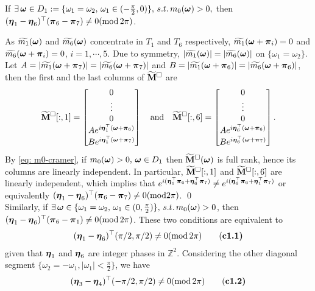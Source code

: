 \begin{lemma}\label{lem: phase-ineq}
If $\exists\,\boldsymbol{\omega}\in D_1:=\{\omega_1=\omega_2,\,\omega_1\in(-\frac{\pi}{2},0)\},\,s.t. \,m_0(\boldsymbol{\omega})>0,$ then $(\boldsymbol{\eta}_1-\boldsymbol{\eta}_6)^\top (\boldsymbol{\pi}_6-\boldsymbol{\pi}_7)\neq 0(\text{mod}\,2\pi)$. 
\end{lemma} 
As $\widetilde{m_{1}}(\boldsymbol{\omega})$ and $\widetilde{m_{6}}(\boldsymbol{\omega})$ concentrate in $T_1$ and $T_6$ respectively, $\widetilde{m_1}(\boldsymbol{\omega} + \boldsymbol{\pi}_i) = 0$ and  $\widetilde{m_6}(\boldsymbol{\omega} + \boldsymbol{\pi}_i) = 0$, $i = 1,\cdots, 5$. Due to symmetry, $|\widetilde{m_1}(\boldsymbol{\omega})| = |\widetilde{m_6}(\boldsymbol{\omega})|$ on $\{\omega_1=\omega_2\}$. Let $A = |\widetilde{m_1}(\boldsymbol{\omega}+\boldsymbol{\pi}_7)| = |\widetilde{m_6}(\boldsymbol{\omega}+\boldsymbol{\pi}_7)|$ and $B=|\widetilde{m_1}(\boldsymbol{\omega}+\boldsymbol{\pi}_6)| = |\widetilde{m_6}(\boldsymbol{\omega}+\boldsymbol{\pi}_6)|$, then the first and the last columns of $\widetilde{\mathbf{M}}^{\Box}$ are
  \begin{align*}
  \widetilde{\mathbf{M}}^{\Box}[:,1] = 
 \begin{bmatrix}
 0\\
 \vdots\\
 0\\
 Ae^{i\boldsymbol{\eta}_1^\top(\boldsymbol{\omega}+\boldsymbol{\pi}_6)}\\
 Be^{i\boldsymbol{\eta}_1^\top(\boldsymbol{\omega}+\boldsymbol{\pi}_7)}
 \end{bmatrix}
 \quad\text{and}\quad
  \widetilde{\mathbf{M}}^{\Box}[:,6] = 
 \begin{bmatrix}
 0\\
 \vdots\\
 0\\
 Ae^{i\boldsymbol{\eta}_6^\top(\boldsymbol{\omega}+\boldsymbol{\pi}_6)}\\
 Be^{i\boldsymbol{\eta}_6^\top(\boldsymbol{\omega}+\boldsymbol{\pi}_7)}
 \end{bmatrix} .
\end{align*}   
By \eqref{eq: m0-cramer}, if $m_0(\boldsymbol{\omega})>0, \,\boldsymbol{\omega}\in D_1$ then $\widetilde{\mathbf{M}}^{\Box}(\boldsymbol{\omega})$ is full rank, hence its columns are linearly independent.
In particular, $\widetilde{\mathbf{M}}^{\Box}[:,1]$ and $\widetilde{\mathbf{M}}^{\Box}[:,6]$ are linearly independent, which implies that $e^{i(\boldsymbol{\eta}_1^\top\boldsymbol{\pi}_6 + \boldsymbol{\eta}_6^\top\boldsymbol{\pi}_7)}\neq e^{i(\boldsymbol{\eta}_6^\top\boldsymbol{\pi}_6 + \boldsymbol{\eta}_1^\top\boldsymbol{\pi}_7)}$%
 or equivalently $(\boldsymbol{\eta}_1-\boldsymbol{\eta}_6)^\top(\boldsymbol{\pi}_6-\boldsymbol{\pi}_7)\neq 0(\text{mod}2\pi)$. \qed\\

Similarly, if $\exists\,\boldsymbol{\omega}\in \{\omega_1 = \omega_2,\, \omega_1\in(0,\frac{\pi}{2})\},\, s.t.\, m_0(\boldsymbol{\omega}) > 0$, then $(\boldsymbol{\eta}_1-\boldsymbol{\eta}_6)^\top (\boldsymbol{\pi}_6-\boldsymbol{\pi}_1)\neq 0(\text{mod}\,2\pi)$. These two conditions are equivalent to 
\begin{align*}
(\boldsymbol{\eta}_1-\boldsymbol{\eta}_6)^\top(\pi/2,\pi/2)\neq 0 (\text{mod}\,2\pi)\tag{\bf c1.1}
\end{align*}
given that $\boldsymbol{\eta}_1$ and $\boldsymbol{\eta}_6$ are integer phases in $\mathbb{Z}^2$.
Considering the other diagonal segment $\{\omega_2 = -\omega_1, |\omega_1| <\frac{\pi}{2}\}$, we have 
\begin{align*}
(\boldsymbol{\eta}_3-\boldsymbol{\eta}_4)^\top(-\pi/2,\pi/2)\neq 0 (\text{mod}\, 2\pi)\tag{\bf c1.2}
\end{align*}

